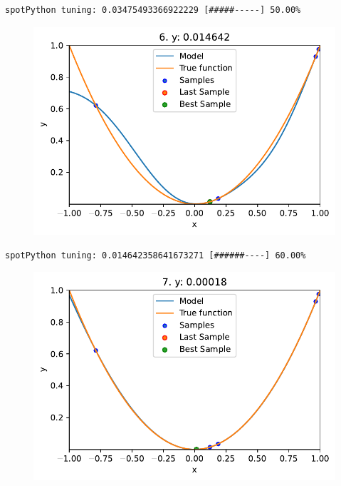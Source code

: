 \documentclass[
  letterpaper,
  DIV=11,
  numbers=noendperiod]{scrreprt}
\begin{document}
\begin{verbatim}
spotPython tuning: 0.03475493366922229 [#####-----] 50.00% 
\end{verbatim}

\begin{figure}[H]

{\centering \includegraphics{010_num_spot_sklearn_surrogate_files/figure-pdf/cell-21-output-6.pdf}

}

\end{figure}

\begin{verbatim}
spotPython tuning: 0.014642358641673271 [######----] 60.00% 
\end{verbatim}

\begin{figure}[H]

{\centering \includegraphics{010_num_spot_sklearn_surrogate_files/figure-pdf/cell-21-output-8.pdf}

}

\end{figure}
\end{document}
